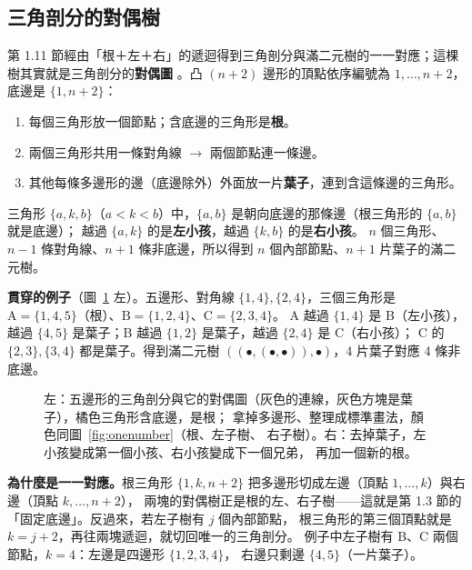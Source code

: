 \subsection{三角剖分的對偶樹}\label{sec:m07}

第 1.11 節經由「根＋左＋右」的遞迴得到三角剖分與滿二元樹的一一對應；這棵樹其實就是三角剖分的\textbf{對偶圖}
。凸 $(n+2)$ 邊形的頂點依序編號為 $1,\ldots,n+2$，底邊是 $\{1,n+2\}$：
\begin{enumerate}[leftmargin=1.6em]
  \item 每個三角形放一個節點；含底邊的三角形是\textcolor{cTop}{\textbf{根}}。
  \item 兩個三角形共用一條對角線 $\to$ 兩個節點連一條邊。
  \item 其他每條多邊形的邊（底邊除外）外面放一片\textbf{葉子}，連到含這條邊的三角形。
\end{enumerate}
三角形 $\{a,k,b\}$（$a<k<b$）中，$\{a,b\}$ 是朝向底邊的那條邊（根三角形的 $\{a,b\}$ 就是底邊）；
越過 $\{a,k\}$ 的是\textbf{左小孩}，越過 $\{k,b\}$ 的是\textbf{右小孩}。
$n$ 個三角形、$n-1$ 條對角線、$n+1$ 條非底邊，所以得到 $n$ 個內部節點、$n+1$ 片葉子的滿二元樹。

\textbf{貫穿的例子}（圖~\ref{fig:m07-dual} 左）。五邊形、對角線 $\{1,4\},\{2,4\}$，三個三角形是
\textcolor{cTop}{$\mathrm{A}=\{1,4,5\}$}（根）、$\mathrm{B}=\{1,2,4\}$、$\mathrm{C}=\{2,3,4\}$。
A 越過 $\{1,4\}$ 是 B（左小孩），越過 $\{4,5\}$ 是葉子；B 越過 $\{1,2\}$ 是葉子，越過 $\{2,4\}$ 是 C（右小孩）；
C 的 $\{2,3\},\{3,4\}$ 都是葉子。得到滿二元樹 $((\bullet,(\bullet,\bullet)),\bullet)$，4 片葉子對應 4 條非底邊。

\begin{figure}[H]
\centering
\FigMsevenDual
\caption{左：五邊形的三角剖分與它的對偶圖（灰色的連線，灰色方塊是葉子），\textcolor{cTop}{橘色}三角形含底邊，是根；
拿掉多邊形、整理成標準畫法，顏色同圖~\ref{fig:onenumber}（\textcolor{cTop}{根}、\textcolor{cLeft}{左子樹}、
\textcolor{cRight}{右子樹}）。右：去掉葉子，\textcolor{cLeft}{左小孩}變成第一個小孩、\textcolor{cRight}{右小孩}變成下一個兄弟，
再加一個新的根。}
\label{fig:m07-dual}
\end{figure}

\textbf{為什麼是一一對應。}根三角形 $\{1,k,n+2\}$ 把多邊形切成左邊（頂點 $1,\ldots,k$）與右邊（頂點 $k,\ldots,n+2$），
兩塊的對偶樹正是根的左、右子樹——這就是第 1.3 節的「固定底邊」。反過來，若左子樹有 $j$ 個內部節點，
根三角形的第三個頂點就是 $k=j+2$，再往兩塊遞迴，就切回唯一的三角剖分。
例子中左子樹有 B、C 兩個節點，$k=4$：左邊是\textcolor{cLeft}{四邊形 $\{1,2,3,4\}$}，
右邊只剩\textcolor{cRight}{邊 $\{4,5\}$}（一片葉子）。

